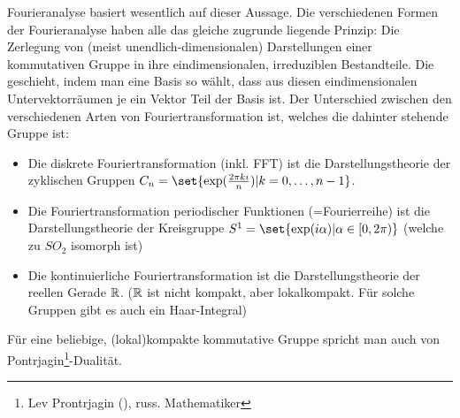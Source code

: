 \begin{remark}
Fourieranalyse basiert wesentlich auf dieser Aussage. Die verschiedenen Formen der Fourieranalyse haben alle das gleiche zugrunde liegende Prinzip: Die Zerlegung von (meist unendlich-dimensionalen) Darstellungen einer kommutativen Gruppe in ihre eindimensionalen, irreduziblen Bestandteile. Die geschieht, indem man eine Basis so wählt, dass aus diesen eindimensionalen Untervektorräumen je ein Vektor Teil der Basis ist. Der Unterschied zwischen den verschiedenen Arten von Fouriertransformation ist, welches die dahinter stehende Gruppe ist:

\begin{itemize}
\item Die diskrete Fouriertransformation (inkl. FFT) ist die Darstellungstheorie der zyklischen Gruppen $C_n = \set{\exp(\frac{2\pi k i}{n}) | k=0,\ldots,n-1}$.
\item Die Fouriertransformation periodischer Funktionen (=Fourierreihe) ist die Darstellungstheorie der Kreisgruppe $S^1 = \set{\exp(i\alpha) | \alpha\in[0,2\pi)}$ (welche zu $SO_2$ isomorph ist)
\item Die kontinuierliche Fouriertransformation ist die Darstellungstheorie der reellen Gerade $\mathbb{R}$. ($\mathbb{R}$ ist nicht kompakt, aber lokalkompakt. Für solche Gruppen gibt es auch ein Haar-Integral)
\end{itemize}

Für eine beliebige, (lokal)kompakte kommutative Gruppe spricht man auch von
Pontrjagin\footnote{Lev Prontrjagin (), russ. Mathematiker}-Dualität.
\end{remark}

